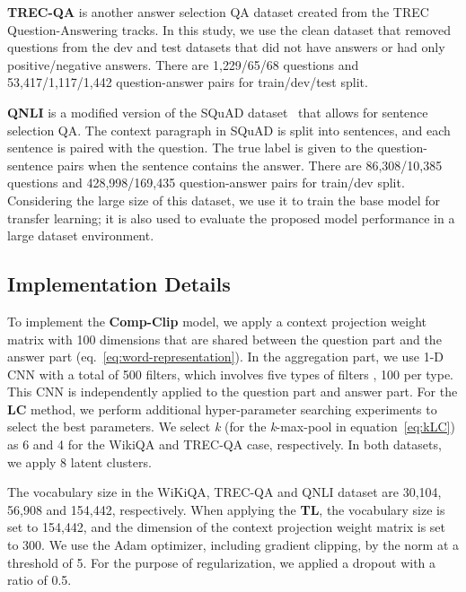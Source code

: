\documentclass[sigconf]{acmart}
\begin{document}
\vspace*{2mm}
\noindent\textbf{TREC-QA}
\cite{wang2007jeopardy} is another answer selection QA dataset created from the TREC Question-Answering tracks. In this study, we use the clean dataset that removed questions from the dev and test datasets that did not have answers or had only positive/negative answers. There are 1,229/65/68 questions and 53,417/1,117/1,442 question-answer pairs for train/dev/test split.

\vspace*{2mm}
\noindent\textbf{QNLI}
\cite{wang2018glue} is a modified version of the SQuAD dataset~\cite{rajpurkar2016squad} that allows for sentence selection QA. The context paragraph in SQuAD is split into sentences, and each sentence is paired with the question. The true label is given to the question-sentence pairs when the sentence contains the answer. There are 86,308/10,385 questions and 428,998/169,435 question-answer pairs for train/dev split. Considering the large size of this dataset, we use it to train the base model for transfer learning; it is also used to evaluate the proposed model performance in a large dataset environment.



\subsection{Implementation Details}
\label{sec:implementation_details}
To implement the \textbf{Comp-Clip} model, we apply a context projection weight matrix with 100 dimensions that are shared between the question part and the answer part (eq.~\ref{eq:word-representation}). In the aggregation part, we use 1-D CNN with a total of 500 filters, which involves five types of filters , 100 per type. 
This CNN is independently applied to the question part and answer part.
For the \textbf{LC} method, we perform additional hyper-parameter searching experiments to select the best parameters. We select \textit{k} (for the \textit{k}-max-pool in equation~\ref{eq:kLC}) as 6 and 4 for the WikiQA and TREC-QA case, respectively. In both datasets, we apply 8 latent clusters.

The vocabulary size in the WiKiQA, TREC-QA and QNLI dataset are 30,104, 56,908 and 154,442, respectively. 
When applying the \textbf{TL}, the vocabulary size is set to 154,442, and the dimension of the context projection weight matrix is set to 300.
We use the Adam optimizer, including gradient clipping, by the norm at a threshold of 5.
For the purpose of regularization, we applied a dropout with a ratio of 0.5.
\end{document}
